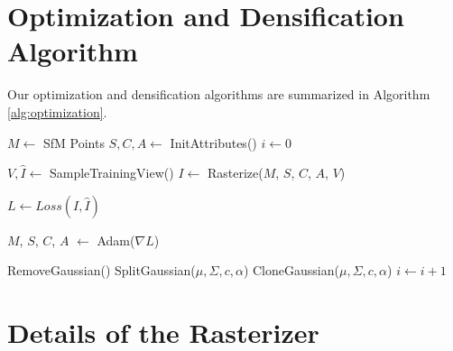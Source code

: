 \begin{appendix}
	\section{Optimization and Densification Algorithm}

	Our optimization and densification algorithms are summarized in Algorithm \ref{alg:optimization}.
	\begin{algorithm}[!h]
		\caption{Optimization and Densification\\
		$w$, $h$: width and height of the training images}
		\label{alg:optimization}
		\begin{algorithmic}
			\State $M \gets$ SfM Points	
			\State $S, C, A \gets$ InitAttributes() 
			\State $i \gets 0$	


			\State $V, \hat{I} \gets$ SampleTrainingView()	
			\State $I \gets$ Rasterize($M$, $S$, $C$, $A$, $V$)	

			\State $L \gets Loss(I, \hat{I}) $ 

			\State $M$, $S$, $C$, $A$ $\gets$ Adam($\nabla L$) 


				
			\State RemoveGaussian()
			\EndIf
			 
				
			\State SplitGaussian($\mu, \Sigma, c, \alpha$)
			\Else								{}
			\State CloneGaussian($\mu, \Sigma, c, \alpha$)
			\EndIf
			\EndIf
			\EndFor
			\EndIf
			\State $i \gets i+1$
			\EndWhile
		\end{algorithmic}
	\end{algorithm}






	\section{Details of the Rasterizer}
	\label{app:raster}


\end{appendix}
